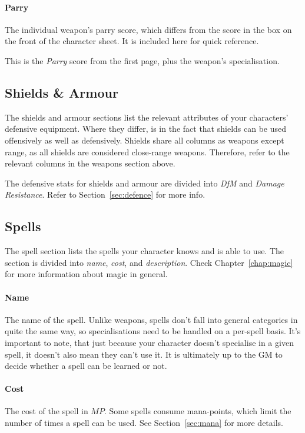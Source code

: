 \paragraph{Parry} The individual weapon's parry score, which differs from the score in the box on the front of the character sheet.
It is included here for quick reference.

This is the \textit{Parry} score from the first page, plus the weapon's specialisation.

\subsection{Shields \& Armour}
The shields and armour sections list the relevant attributes of your characters' defensive equipment.
Where they differ, is in the fact that shields can be used offensively as well as defensively.
Shields share all columns as weapons except range, as all shields are considered close-range weapons.
Therefore, refer to the relevant columns in the weapons section above.

The defensive stats for shields and armour are divided into \textit{DfM} and \textit{Damage Resistance}.
Refer to Section~\ref{sec:defence} for more info.

\subsection{Spells}
The spell section lists the spells your character knows and is able to use.
The section is divided into \textit{name}, \textit{cost}, and \textit{description}.
Check Chapter~\ref{chap:magic} for more information about magic in general.

\paragraph{Name} The name of the spell.
Unlike weapons, spells don't fall into general categories in quite the same way, so specialisations need to be handled on a per-spell basis.
It's important to note, that just because your character doesn't specialise in a given spell, it doesn't also mean they can't use it.
It is ultimately up to the GM to decide whether a spell can be learned or not.

\paragraph{Cost} The cost of the spell in $MP$.
Some spells consume mana-points, which limit the number of times a spell can be used.
See Section~\ref{sec:mana} for more details.

